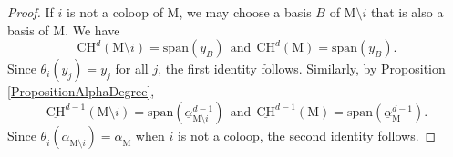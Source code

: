 \documentclass[11pt,reqno]{amsart}
\theoremstyle{definition}
\theoremstyle{remark}
\renewcommand{\(}{\left(}
\renewcommand{\)}{\right)}
\newcommand{\<}{\left<}
\renewcommand{\>}{\right>}
\begin{document}
\begin{proof}
If $i$ is not a coloop of $\mathrm{M}$, we may choose a basis $B$ of $\mathrm{M} \setminus i$ that is also a basis of $\mathrm{M}$. 
We have
\[
 \mathrm{CH}^d(\mathrm{M}\setminus i)=\text{span}(y_B) \ \ \text{and} \ \  \mathrm{CH}^d(\mathrm{M})=\text{span}(y_B).
 \]
Since $\theta_i(y_j)=y_j$ for all $j$, the first identity follows.
Similarly, by  Proposition \ref{PropositionAlphaDegree}, %
\[
\underline{\mathrm{CH}}^{d-1}(\mathrm{M}\setminus i)=\text{span}(\underline\alpha_{\mathrm{M}\setminus i}^{d-1}) \ \ \text{and} \ \   \underline{\mathrm{CH}}^{d-1}(\mathrm{M})=\text{span}(\underline\alpha_{\mathrm{M}}^{d-1}).
\]
Since  $\underline{\theta}_i(\underline\alpha_{\mathrm{M}\setminus i}) =\underline\alpha_{\mathrm{M}}$ when $i$ is not a coloop, the second identity follows.


\end{proof}
\end{document}
